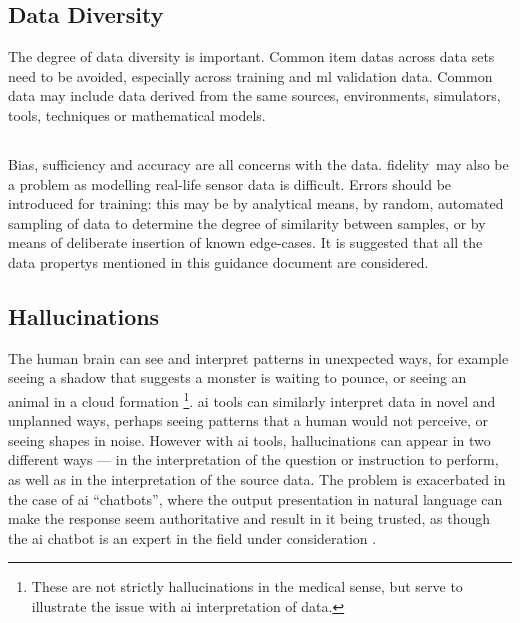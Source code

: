 \subsection{Data Diversity}
The degree of data diversity is important. Common \glspl{item data} across data sets need to be avoided, especially across training and
\gls{ml}
validation data. Common data may include data derived from the same sources, environments, simulators, tools, techniques or mathematical models.

\subsection{}
Bias, sufficiency and \gls{accuracy} are all concerns with the data. \cbstart\gls{fidelity}\cbend\ may also be a problem as modelling real-life sensor data is difficult.  Errors should be introduced for training: this may be by analytical means, by random, automated sampling of data to determine the degree of similarity between samples, or by means of deliberate insertion of known edge-cases. 
It is suggested that all the \glspl{data property} mentioned in this guidance document are considered.

\subsection{Hallucinations}
\label{bkm:MachineLearning:Hallucinations}
%
The human brain can see and interpret patterns in unexpected ways, for example seeing a shadow that
suggests a monster is waiting to pounce, or seeing an animal in a cloud formation%
\footnote{These are not strictly hallucinations in the medical sense, but serve to illustrate
the issue with \gls{ai} interpretation of data.}.
\Gls{ai} tools can similarly interpret data in novel and unplanned ways, perhaps seeing patterns that a
human would not perceive, or seeing shapes in noise. However with \gls{ai} tools, hallucinations can appear
in two different ways --- in the interpretation of the question or instruction to perform, as well as
in the interpretation of the source data.
The problem is exacerbated in the case of \gls{ai} ``chatbots'', where the output presentation in natural
language can make the response seem authoritative and result in it being trusted, as though the
\gls{ai} chatbot is an expert in the field under consideration \cite{citation:chatbotsterrible:website}. 

